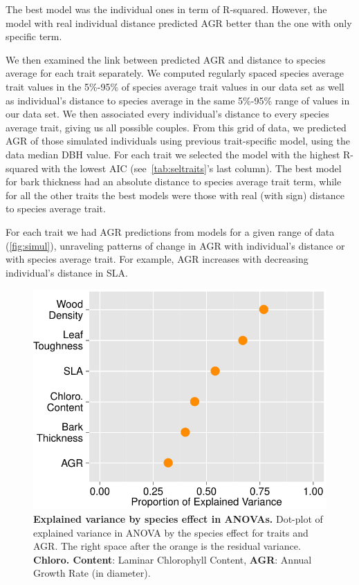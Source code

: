 The best model was the individual ones in term of R-squared. However, the model with real individual distance predicted AGR better than the one with only specific term.

We then examined the link between predicted AGR and distance to species average for each trait separately. We computed regularly spaced species average trait values in the 5\%-95\% of species average trait values in our data set as well as individual's distance to species average in the same 5\%-95\% range of values in our data set. We then associated every individual's distance to every species average trait, giving us all possible couples. From this grid of data, we predicted AGR of those simulated individuals using previous trait-specific model, using the data median DBH value. For each trait we selected the model with the highest R-squared with the lowest AIC (see~\autoref{tab:seltraits}'s last column). The best model for bark thickness had an absolute distance to species average trait term, while for all the other traits the best models were those with real (with sign) distance to species average trait.

For each trait we had AGR predictions from models for a given range of data (\autoref{fig:simul}), unraveling patterns of change in AGR with individual's distance or with species average trait. For example, AGR increases with decreasing individual's distance in SLA.

\begin{figure}[!ht]
	\centering
	\includegraphics{figures/Aov_Var_Traits_2015-05-25.pdf}
	\caption{\textbf{Explained variance by species effect in ANOVAs.} Dot-plot of explained variance in ANOVA by the species effect for traits and AGR. The right space after the orange is the residual variance. \textbf{Chloro. Content}: Laminar Chlorophyll Content, \textbf{AGR}: Annual Growth Rate (in diameter).}
	\label{fig:aov}
\end{figure}

